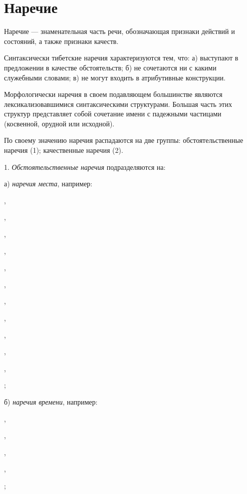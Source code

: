 \section{Наречие}

Наречие --- знаменательная часть речи, обозначающая признаки действий и состояний, а также признаки качеств.

Синтаксически тибетские наречия характеризуются тем, что: а) выступают в предложении в качестве обстоятельств; б) не сочетаются ни с какими служебными словами; в) не могут входить в атрибутивные конструкции.

Морфологически наречия в своем подавляющем большинстве являются лексикализовавшимися синтаксическими структурами. Большая часть этих структур представляет собой сочетание имени с падежными частицами (косвенной, орудной или исходной).

По своему значению наречия распадаются на две группы: обстоятельственные наречия (1); качественные наречия (2).

1. \emph{Обстоятельственные наречия} подразделяются на:

а) \emph{наречия места}, например:
\begin{prfsample}
    \item {},
    \item {},
    \item {},
    \item {},
    \item {},
    \item {},
    \item {},
    \item {},
    \item {},
    \item {},
    \item {},
    \item {};
\end{prfsample}

б) \emph{наречия времени}, например:
\begin{prfsample}
    \item {},
    \item {},
    \item {},
    \item {},
    \item {};
\end{prfsample}

